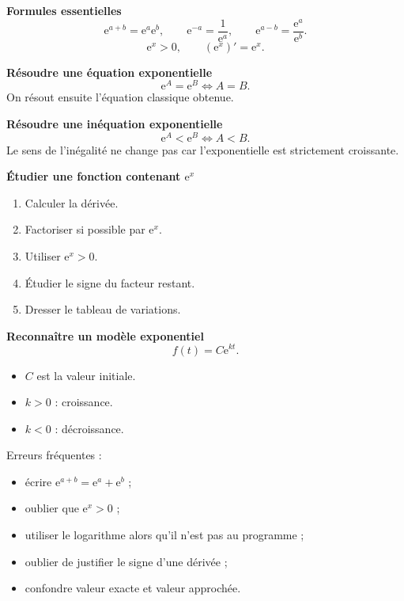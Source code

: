 \documentclass[11pt,a4paper]{article}
\newcommand{\e}{\mathrm{e}}
\begin{document}
\begin{rappelbox}
\textbf{Formules essentielles}
\[
\e^{a+b}=\e^a\e^b,
\qquad
\e^{-a}=\frac{1}{\e^a},
\qquad
\e^{a-b}=\frac{\e^a}{\e^b}.
\]
\[
\e^x>0,
\qquad
(\e^x)'=\e^x.
\]
\end{rappelbox}

\begin{methodebox}
\textbf{Résoudre une équation exponentielle}
\[
\e^A=\e^B
\Longleftrightarrow
A=B.
\]
On résout ensuite l'équation classique obtenue.
\end{methodebox}

\begin{methodebox}
\textbf{Résoudre une inéquation exponentielle}
\[
\e^A<\e^B
\Longleftrightarrow
A<B.
\]
Le sens de l'inégalité ne change pas car l'exponentielle est strictement croissante.
\end{methodebox}

\begin{methodebox}
\textbf{Étudier une fonction contenant $\e^x$}
\begin{enumerate}
    \item Calculer la dérivée.
    \item Factoriser si possible par $\e^x$.
    \item Utiliser $\e^x>0$.
    \item Étudier le signe du facteur restant.
    \item Dresser le tableau de variations.
\end{enumerate}
\end{methodebox}

\begin{methodebox}
\textbf{Reconnaître un modèle exponentiel}
\[
f(t)=C\e^{kt}.
\]
\begin{itemize}
    \item $C$ est la valeur initiale.
    \item $k>0$ : croissance.
    \item $k<0$ : décroissance.
\end{itemize}
\end{methodebox}

\begin{attentionbox}
Erreurs fréquentes :
\begin{itemize}
    \item écrire $\e^{a+b}=\e^a+\e^b$ ;
    \item oublier que $\e^x>0$ ;
    \item utiliser le logarithme alors qu'il n'est pas au programme ;
    \item oublier de justifier le signe d'une dérivée ;
    \item confondre valeur exacte et valeur approchée.
\end{itemize}
\end{attentionbox}
\end{document}
